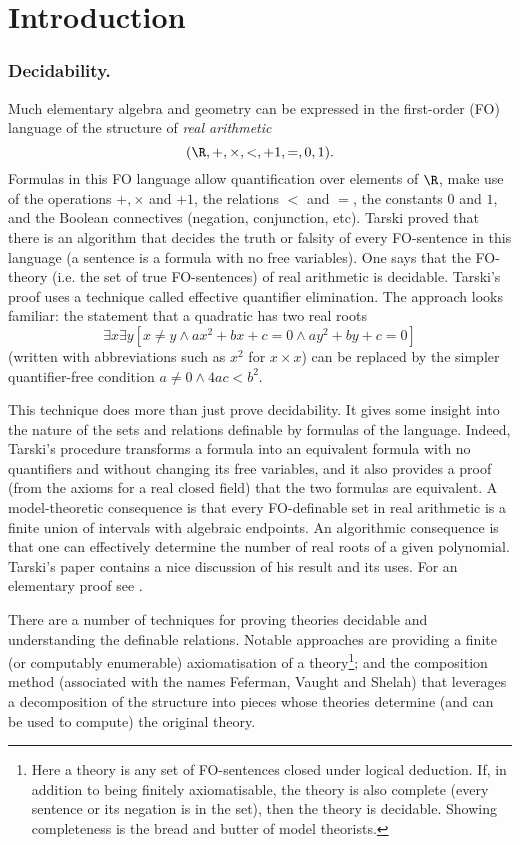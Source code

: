 \section{Introduction} \label{AS:sec:introduction}

\subsubsection*{Decidability.}
Much elementary algebra and geometry can be
expressed in the first-order (FO) language of the structure of {\em real arithmetic}
\[(\R,+,\times,<,+1,=,0,1).\]
Formulas in this FO language allow quantification over elements of $\R$, 
make use of the operations $+, \times$ and $+1$, the relations $<$ and $=$, the constants $0$ and $1$,
and the Boolean connectives (negation, conjunction, etc).
Tarski proved that there is an algorithm that decides the truth or falsity of
every FO-sentence in this language (a sentence is a formula with no free variables). One says that the FO-theory (i.e. the set of true FO-sentences) of real arithmetic
is decidable. Tarski's proof uses a
technique called effective quantifier elimination. The approach looks familiar:
the statement that a quadratic has two real roots
\[
\exists x \exists y [x \neq y \wedge ax^2 + bx + c = 0 \wedge ay^2 + by + c =0]
\]
(written with abbreviations such as $x^2$ for $x \times x$) 
can be replaced by the simpler quantifier-free condition
$a \neq 0 \wedge 4ac < b^2.$ 

This technique does more than just prove decidability. It gives
some insight into the nature of the sets and relations definable by
formulas of the language.  Indeed, Tarski's procedure transforms a
formula into an equivalent formula with no quantifiers and without changing its
free variables, and it also provides a proof (from the axioms for a real closed field) that the two formulas are equivalent. 
A model-theoretic consequence is that every FO-definable set in real arithmetic is a finite union of intervals with algebraic endpoints. An algorithmic consequence
is that one can effectively determine the number of real roots of a given polynomial.
Tarski's paper \cite{Tars51} contains a nice discussion of his result
and its uses. For an elementary proof see \cite{MiOz02}.

There are a number of techniques for proving theories decidable and understanding the definable relations. Notable approaches
are providing a finite (or computably enumerable) axiomatisation of a theory\footnote{Here a theory is any set of FO-sentences closed under logical deduction. If, in addition to being finitely axiomatisable, the theory is also complete (every sentence or its negation is in the set), then the theory is decidable. Showing completeness is the bread and butter of model theorists.}; and  the composition method
(associated with the names Feferman, Vaught and Shelah) that leverages a decomposition of the structure into pieces whose theories determine (and can be used to compute) the original theory.

